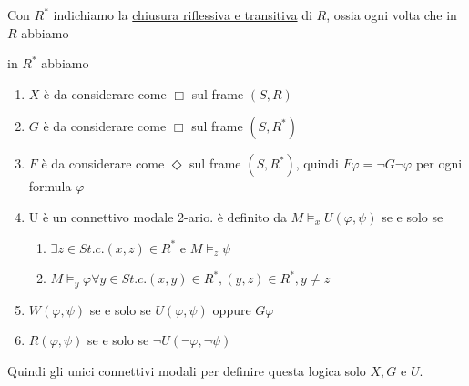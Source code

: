 \documentclass[../main.tex]{subfiles}
\begin{document}
Con $R^*$ indichiamo la \underline{chiusura riflessiva e transitiva} di $R$, ossia ogni volta che in $R$ abbiamo
\begin{center}
\end{center}
in $R^*$ abbiamo
\begin{center}
\end{center}
\begin{enumerate}[label=\arabic*)]
    \item $X$ è da considerare come $\Box$ sul frame $(S,R)$
    \item $G$ è da considerare come $\Box$ sul frame $(S,R^*)$
    \item $F$ è da considerare come $\Diamond$ sul frame $(S,R^*)$, quindi $F \varphi = \neg G \neg \varphi$ per ogni formula $\varphi$
    \item U è un connettivo modale 2-ario. è definito da $M \vDash_x U(\varphi, \psi)$ se e solo se
          \begin{enumerate}[label=\alph*)]
              \item $\exists z \in S t.c. (x,z) \in R^*$ e $M \vDash_z \psi$
              \item $M \vDash_y \varphi \forall y \in S t.c. (x,y) \in R^*, (y,z) \in R^*, y \neq z$
          \end{enumerate}
    \item $W(\varphi, \psi)$ se e solo se $U(\varphi, \psi)$ oppure $G \varphi$
    \item $R(\varphi, \psi)$ se e solo se $\neg U(\neg \varphi, \neg \psi)$
\end{enumerate}
Quindi gli unici connettivi modali per definire questa logica solo $X, G$ e $U$.
\end{document}
